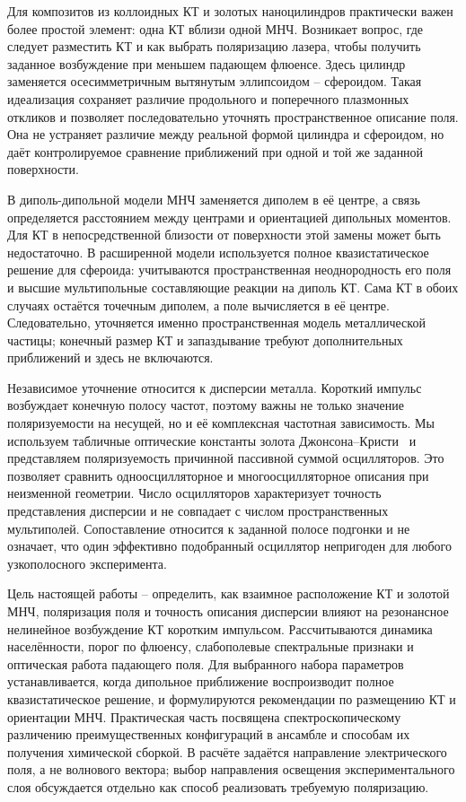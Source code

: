 Для композитов из коллоидных КТ и золотых наноцилиндров практически важен
более простой элемент: одна КТ вблизи одной МНЧ. Возникает вопрос, где следует
разместить КТ и как выбрать поляризацию лазера, чтобы получить заданное
возбуждение при меньшем падающем флюенсе. Здесь цилиндр заменяется
осесимметричным вытянутым эллипсоидом -- сфероидом. Такая идеализация
сохраняет различие продольного и поперечного плазмонных откликов и позволяет
последовательно уточнять пространственное описание поля. Она не устраняет
различие между реальной формой цилиндра и сфероидом, но даёт контролируемое
сравнение приближений при одной и той же заданной поверхности.

В диполь-дипольной модели МНЧ заменяется диполем в её центре, а связь
определяется расстоянием между центрами и ориентацией дипольных моментов.
Для КТ в непосредственной близости от поверхности этой замены может быть
недостаточно. В расширенной модели используется полное квазистатическое
решение для сфероида: учитываются пространственная неоднородность его поля
и высшие мультипольные составляющие реакции на диполь КТ. Сама КТ в обоих
случаях остаётся точечным диполем, а поле вычисляется в её центре.
Следовательно, уточняется именно пространственная модель металлической
частицы; конечный размер КТ и запаздывание требуют дополнительных
приближений и здесь не включаются.

Независимое уточнение относится к дисперсии металла. Короткий импульс
возбуждает конечную полосу частот, поэтому важны не только значение
поляризуемости на несущей, но и её комплексная частотная зависимость.
Мы используем табличные оптические константы золота
Джонсона--Кристи~\cite{johnson1972} и представляем поляризуемость причинной
пассивной суммой осцилляторов. Это позволяет сравнить одноосцилляторное
и многоосцилляторное описания при неизменной геометрии. Число осцилляторов
характеризует точность представления дисперсии и не совпадает с числом
пространственных мультиполей. Сопоставление относится к заданной полосе
подгонки и не означает, что один эффективно подобранный осциллятор
непригоден для любого узкополосного эксперимента.

Цель настоящей работы -- определить, как взаимное расположение КТ и золотой
МНЧ, поляризация поля и точность описания дисперсии влияют на резонансное
нелинейное возбуждение КТ коротким импульсом. Рассчитываются динамика
населённости, порог по флюенсу, слабополевые спектральные признаки
и оптическая работа падающего поля. Для выбранного набора параметров
устанавливается, когда дипольное приближение воспроизводит полное
квазистатическое решение, и формулируются рекомендации по размещению КТ
и ориентации МНЧ. Практическая часть посвящена спектроскопическому
различению преимущественных конфигураций в ансамбле и способам их получения
химической сборкой. В расчёте задаётся направление электрического поля,
а не волнового вектора; выбор направления освещения экспериментального
слоя обсуждается отдельно как способ реализовать требуемую поляризацию.

